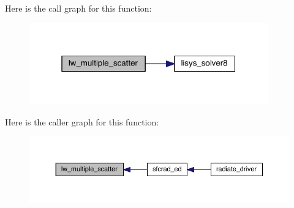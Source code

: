 Here is the call graph for this function\+:\nopagebreak
\begin{figure}[H]
\begin{center}
\leavevmode
\includegraphics[width=292pt]{multiple__scatter_8f90_abda35694b2f8582ddf43bbbe78a8725f_cgraph}
\end{center}
\end{figure}




Here is the caller graph for this function\+:\nopagebreak
\begin{figure}[H]
\begin{center}
\leavevmode
\includegraphics[width=350pt]{multiple__scatter_8f90_abda35694b2f8582ddf43bbbe78a8725f_icgraph}
\end{center}
\end{figure}


\hypertarget{multiple__scatter_8f90_a2a48cb88f4cbc8013f2b09b2fc878d1b}{}
